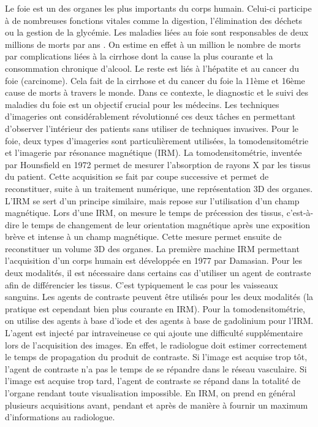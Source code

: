 Le foie est un des organes les plus importants du corps humain. Celui-ci participe à de nombreuses fonctions vitales comme la digestion, l'élimination des déchets ou la gestion de la glycémie. Les maladies liées au foie sont responsables de deux millions de morts par ans \cite{Asrani2019_liver_deseases}. On estime en effet à un million le nombre de morts par complications liées à la cirrhose dont la cause la plus courante et la consommation chronique d'alcool. Le reste est liés à l'hépatite et au cancer du foie (carcinome). Cela fait de la cirrhose et du cancer du foie la 11ème et 16ème cause de morts à travers le monde.
Dans ce contexte, le diagnostic et le suivi des maladies du foie est un objectif crucial pour les médecins. Les techniques d'imageries ont considérablement révolutionné ces deux tâches en permettant d'observer l'intérieur des patients sans utiliser de techniques invasives. Pour le foie, deux types d'imageries sont particulièrement utilisées, la tomodensitométrie et l'imagerie par résonance magnétique (IRM). La tomodensitométrie, inventée par Hounsfield en 1972 permet de mesurer l'absorption de rayons X par les tissus du patient. Cette acquisition se fait par coupe successive et permet de reconstituer, suite à un traitement numérique, une représentation 3D des organes. L'IRM se sert d'un principe similaire, mais repose sur l'utilisation d'un champ magnétique. Lors d'une IRM, on mesure le temps de précession des tissus, c'est-à-dire le temps de changement de leur orientation magnétique après une exposition brève et intense à un champ magnétique. Cette mesure permet ensuite de reconstituer un volume 3D des organes. La première machine IRM permettant l'acquisition d'un corps humain est développée en 1977 par Damasian. Pour les deux modalités, il est nécessaire dans certains cas d'utiliser un agent de contraste afin de différencier les tissus. C'est typiquement le cas pour les vaisseaux sanguins. 
Les agents de contraste peuvent être utilisés pour les deux modalités (la pratique est cependant bien plus courante en IRM). Pour la tomodensitométrie, on utilise des agents à base d'iode et des agents à base de gadolinium pour l'IRM. L'agent est injecté par intraveineuse ce qui ajoute une difficulté supplémentaire lors de l'acquisition des images. En effet, le radiologue doit estimer correctement le temps de propagation du produit de contraste. Si l'image est acquise trop tôt, l'agent de contraste n'a pas le temps de se répandre dans le réseau vasculaire. Si l'image est acquise trop tard, l'agent de contraste se répand dans la totalité de l'organe rendant toute visualisation impossible. En IRM, on prend en général plusieurs acquisitions avant, pendant et après de manière à fournir un maximum d'informations au radiologue.
